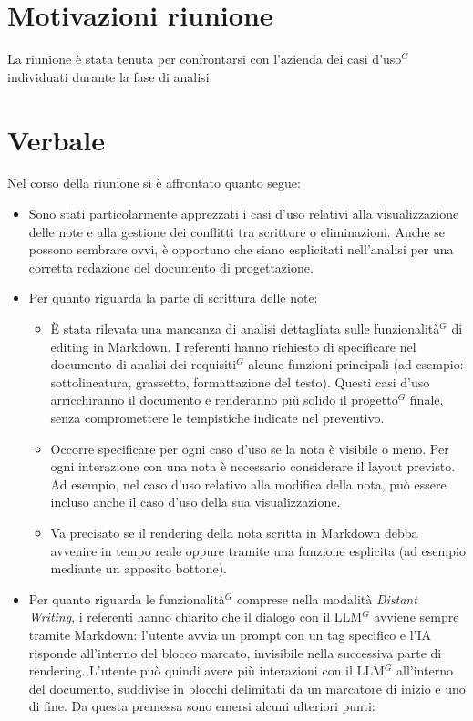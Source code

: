 \documentclass[a4paper,10pt]{article}
\begin{document}
\section*{Motivazioni riunione}
La riunione è stata tenuta per confrontarsi con l'azienda dei casi d'uso$^G$ individuati durante la fase di analisi.

\newpage

\section*{Verbale}
Nel corso della riunione si è affrontato quanto segue: \\
\begin{itemize}
  \item Sono stati particolarmente apprezzati i casi d’uso relativi alla visualizzazione delle note e alla gestione dei conflitti tra scritture o eliminazioni. Anche se possono sembrare ovvi, è opportuno che siano esplicitati nell’analisi per una corretta redazione del documento di progettazione. \\
  \item Per quanto riguarda la parte di scrittura delle note:
  \begin{itemize}\setlength{\itemsep}{6pt}
    \item È stata rilevata una mancanza di analisi dettagliata sulle funzionalità$^G$ di editing in Markdown. I referenti hanno richiesto di specificare nel documento di analisi dei requisiti$^G$ alcune funzioni principali (ad esempio: sottolineatura, grassetto, formattazione del testo). Questi casi d’uso arricchiranno il documento e renderanno più solido il progetto$^G$ finale, senza compromettere le tempistiche indicate nel preventivo.
    \item Occorre specificare per ogni caso d’uso se la nota è visibile o meno. Per ogni interazione con una nota è necessario considerare il layout previsto. Ad esempio, nel caso d’uso relativo alla modifica della nota, può essere incluso anche il caso d’uso della sua visualizzazione.
    \item Va precisato se il rendering della nota scritta in Markdown debba avvenire in tempo reale oppure tramite una funzione esplicita (ad esempio mediante un apposito bottone). \\
  \end{itemize}
  \item Per quanto riguarda le funzionalità$^G$ comprese nella modalità \textit{Distant Writing}, i referenti hanno chiarito che il dialogo con il LLM$^G$ avviene sempre tramite Markdown: l’utente avvia un prompt con un tag specifico e l’IA risponde all’interno del blocco marcato, invisibile nella successiva parte di rendering. L’utente può quindi avere più interazioni con il LLM$^G$ all’interno del documento, suddivise in blocchi delimitati da un marcatore di inizio e uno di fine. Da questa premessa sono emersi alcuni ulteriori punti:

\end{itemize}
\end{document}
